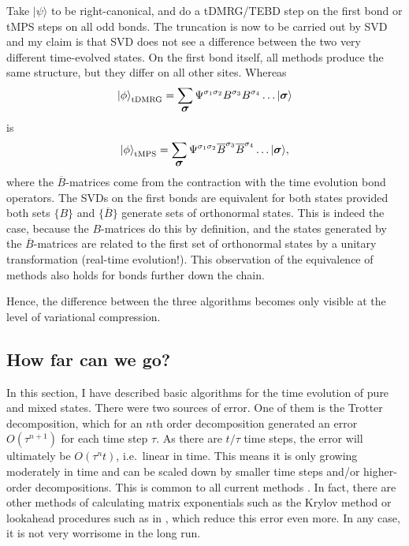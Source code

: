 \documentclass[a4paper,10pt,oneside,onecolumn,1p,times]{elsarticle}
\newcommand{\ket}[1]{\mbox{$| #1  \rangle$}}
\newcommand{\fat}[1]{\mbox{\boldmath$#1$\unboldmath}}	%
\begin{document}
Take $\ket{\psi}$ to be right-canonical, and do a tDMRG/TEBD step on the first bond or tMPS steps on all odd bonds. The truncation is now to be carried out by SVD and my claim is that SVD does not see a difference between the two very different time-evolved states. On the first bond itself, all methods produce the same structure, but they differ on all other sites. Whereas
\begin{equation}
\ket{\phi}_{{\rm tDMRG}} = \sum_{\fat{\sigma}} \Psi^{\sigma_1\sigma_2} B^{\sigma_3} B^{\sigma_4} \ldots \ket{\fat{\sigma}}  
\end{equation}
is 
\begin{equation}
\ket{\phi}_{{\rm tMPS}} = \sum_{\fat{\sigma}} \Psi^{\sigma_1\sigma_2} \overline{B}^{\sigma_3} \overline{B}^{\sigma_4} \ldots \ket{\fat{\sigma}}  ,
\end{equation}
where the $\overline{B}$-matrices come from the contraction with the time evolution bond operators. The SVDs on the first bonds are equivalent for both states provided both sets $\{ B \}$ and $\{ \overline{B} \}$ generate sets of orthonormal states. This is indeed the case, because the $B$-matrices do this by definition, and the states generated by the $\overline{B}$-matrices are related to the first set of orthonormal states by a unitary transformation (real-time evolution!). This observation of the equivalence of methods also holds for bonds further down the chain.

Hence, the difference between the three algorithms becomes only visible at the level of variational compression.
 
\subsection{How far can we go?} 
In this section, I have described basic algorithms for the time evolution of pure and mixed states. There were two sources of error. One of them is the Trotter decomposition, which for an $n$th order decomposition generated an error $O(\tau^{n+1})$ for each time step $\tau$. As there are $t/\tau$ time steps, the error will ultimately be $O(\tau^n t)$, i.e.\ linear in time. This means it is only growing moderately in time and can be scaled down by smaller time steps and/or higher-order decompositions. This is common to all current methods \cite{Vidal03a,Vidal04b,Daley04,WhiteFeiguin04,VerstraeteRipoll04}.  In fact, there are other methods of calculating matrix exponentials such as the Krylov method\cite{Schmitteckert04} or lookahead procedures such as in \cite{Feiguin05}, which reduce this error even more. In any case, it is not very worrisome in the long run. 
\end{document}
